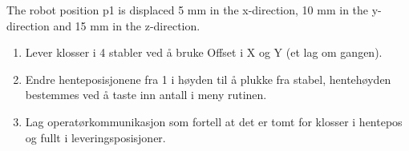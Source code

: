 The robot position p1 is displaced 5 mm in the x-direction, 10 mm
in the y-direction and 15 mm in the z-direction.
\begin{enumerate}
\item Lever klosser i 4 stabler ved å bruke Offset i X og Y (et lag om gangen). 
\item Endre henteposisjonene fra 1 i høyden til å plukke fra stabel, hentehøyden
bestemmes ved å taste inn antall i meny rutinen. 
\item Lag operatørkommunikasjon som fortell at det er tomt for klosser i
hentepos og fullt i leveringsposisjoner.
\end{enumerate}
\newpage{}














\vfil \eject


















